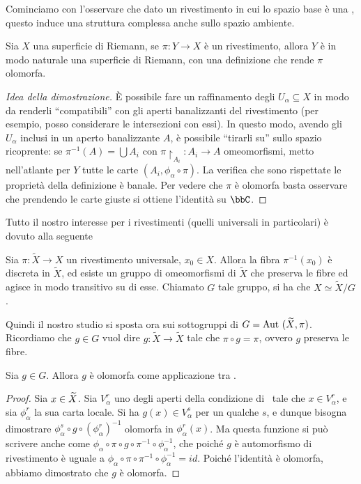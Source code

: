 Cominciamo con l'osservare che dato un rivestimento in cui lo spazio base è una \sdR, questo induce una struttura complessa anche sullo spazio ambiente.
\begin{proposizione}\label{sdr_strut_riv}
Sia $X$ una superficie di Riemann, se $\pi:Y\rightarrow X$ è un rivestimento, allora $Y$ è in modo naturale una superficie di Riemann, con una definizione che rende $\pi$ olomorfa.
\end{proposizione}
\begin{proof}[Idea della dimostrazione]
È possibile fare un raffinamento degli $U_\alpha\subseteq X$ in modo da renderli ``compatibili'' con gli aperti banalizzanti del rivestimento (per esempio, posso considerare le intersezioni con essi). In questo modo, avendo gli $U_\alpha$ inclusi in un aperto banalizzante $A$, è possibile ``tirarli su'' sullo spazio ricoprente: se $\pi^{-1}(A)=\bigcup A_i$ con $\pi\restriction_{A_i}:A_i\to A$ omeomorfismi, metto nell'atlante per $Y$ tutte le carte $(A_i,\phi_\alpha\circ\pi)$. La verifica che sono rispettate le proprietà della definizione è banale. Per vedere che $\pi$ è olomorfa basta osservare che prendendo le carte giuste si ottiene l'identità su $\bbC$.
\end{proof}

Tutto il nostro interesse per i rivestimenti (quelli universali in particolari) è dovuto alla seguente
\begin{osservazione}
Sia $\pi:\widetilde{X}\rightarrow X$ un rivestimento universale, $x_0\in X$. Allora la fibra $\pi^{-1}(x_0)$ è discreta in $\widetilde{X}$, ed esiste un gruppo di omeomorfismi di $\widetilde{X}$ che preserva le fibre ed agisce in modo transitivo su di esse. Chiamato $G$ tale gruppo, si ha che $X \simeq \widetilde{X}/G$.
\end{osservazione}

Quindi il nostro studio si sposta ora sui sottogruppi di $G=\text{Aut }(\widetilde X,\pi)$.\\
Ricordiamo che $g\in G$ vuol dire $g:\widetilde X\to\widetilde X$ tale che $\pi\circ g=\pi$, ovvero $g$ preserva le fibre.
\begin{proposizione}
 	Sia $g\in G$. Allora $g$ è olomorfa come applicazione tra \sdR.
\end{proposizione}
\begin{proof}
 	Sia $x\in \widetilde{X}$. Sia $V_\alpha^r$ uno degli aperti della condizione di \sdR\ tale che $x\in V_\alpha^r$, e sia $\phi_\alpha^r$ la sua carta locale. Si ha $g(x)\in V_\alpha^s$ per un qualche $s$, e dunque bisogna dimostrare $\phi_\alpha^s\circ g\circ (\phi_\alpha^r)^{-1}$ olomorfa in $\phi_\alpha^r(x)$. Ma questa funzione si può scrivere anche come $\phi_\alpha\circ\pi\circ g\circ \pi^{-1}\circ \phi_\alpha^{-1}$, che poiché $g$ è automorfismo di rivestimento è uguale a $\phi_\alpha\circ\pi\circ\pi^{-1}\circ\phi_\alpha^{-1}=id$. Poiché l'identità è olomorfa, abbiamo dimostrato che $g$ è olomorfa.
\end{proof}


